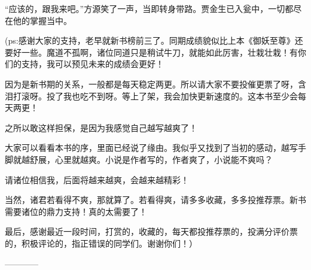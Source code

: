 \begin{this_body}
“应该的，跟我来吧。”方源笑了一声，当即转身带路。贾金生已入瓮中，一切都尽在他的掌握当中。

(ps:感谢大家的支持，老早就新书榜前三了。同期成绩貌似比上本《御妖至尊》还要好一些。魔道不孤啊，诸位同道只是稍试牛刀，就能如此厉害，壮栽壮栽！有你们的支持，我可以预见未来的成绩会更好！

因为是新书期的关系，一般都是每天稳定两更。所以请大家不要投催更票了呀，含泪打滚呀。投了我也吃不到呀。等上了架，我会加快更新速度的。这本书至少会每天两更！

之所以敢这样担保，是因为我感觉自己越写越爽了！

大家可以看看本书的序，里面已经说了缘由。我似乎又找到了当初的感动，越写手脚就越舒展，心里就越爽。小说是作者写的，作者爽了，小说能不爽吗？

请诸位相信我，后面将越来越爽，会越来越精彩！

当然，诸君若看得不爽，那就算了。若看得爽，请多多收藏，多多投推荐票。新书需要诸位的鼎力支持！真的太需要了！

最后，感谢最近一段时间，打赏的，收藏的，每天都投推荐票的，投满分评价票的，积极评论的，指正错误的同学们。谢谢你们！）

------------

\end{this_body}

